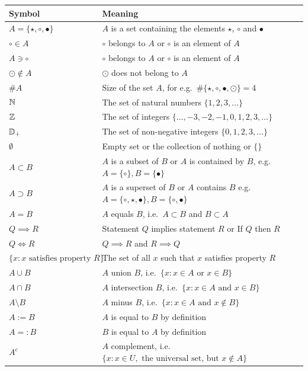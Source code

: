 \begin{table}[htb]
\centering
{\small
\begin{tabular}{| l | l |}
\hline
Symbol & Meaning\\ \hline
$A = \{ \star, \circ, \bullet \}$& $A$ is a set containing the elements $\star$, $\circ$ and $\bullet$ \\
$\circ \in A$ & $\circ$ belongs to $A$ or $\circ$ is an element of $A$\\
$A \ni \circ$ & $\circ$ belongs to $A$ or $\circ$ is an element of $A$\\
$\odot \notin A$& $\odot$ does not belong to $A$ \\
$\# A$& Size of the set $A$, for e.g.~$\#\{ \star, \circ, \bullet, \odot \}=4$\\
$\mathbb{N}$& The set of natural numbers $\{1,2,3,\ldots\}$\\
$\mathbb{Z}$&The set of integers $\{\ldots,-3,-2,-1,0,1,2,3,\ldots\}$\\
$\mathbb{D}_+$& The set of non-negative integers $\{0,1,2,3,\ldots\}$\\
$\emptyset$&Empty set or the collection of nothing or $\{\}$\\
$A \subset B$ & $A$ is a subset of $B$ or $A$ is contained by $B$, e.g.~$A=\{\circ\}, B=\{\bullet\}$\\
$A \supset B$& $A$ is a superset of $B$ or $A$ contains $B$ e.g.~$A=\{\circ, \star,\bullet\}, B=\{\circ, \bullet\}$ \\
$A=B$ & $A$ equals $B$, i.e.~$A \subset B$ and  $B \subset A$\\
$Q \implies R$ & Statement $Q$ implies statement $R$ or If $Q$ then $R$ \\
$Q \iff R$ & $Q \implies R$ and $R \implies Q$ \\
$\{x: x \text{ satisfies property } R \}$& The set of all $x$ such that $x$ satisfies property $R$\\
$A \cup B$& $A$ union $B$, i.e.~$\{x: x\in A \text{ or } x \in B\}$\\
$A \cap B$& $A$ intersection $B$, i.e.~$\{x: x\in A \text{ and } x \in B\}$\\
$A \setminus B $& $A$ minus $B$, i.e.~$\{x: x\in A \text{ and } x \notin B\}$\\
$A:=B$& $A$ is equal to $B$ by definition\\
$A=:B$& $B$ is equal to $A$ by definition\\
$A^c$& $A$ complement, i.e.~$\{x: x\in U, \text{ the universal set, but } x \notin A\}$\\ 

\end{tabular}}
\end{table}
